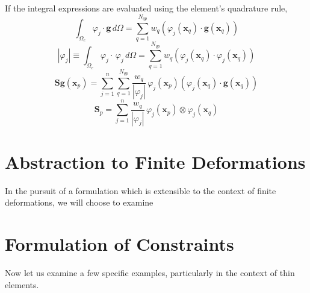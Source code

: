 \documentclass[12pt]{article}
\begin{document}
If the integral expressions are evaluated using the element's quadrature rule,
\begin{equation}
	\int_{\Omega_e} \varphi_j \cdot \mathbf{g} \, d \Omega = \sum_{q = 1}^{N_{qp}} w_q (\varphi_j (\mathbf{x}_q) \cdot \mathbf{g} (\mathbf{x}_q))
\end{equation}
\begin{equation}
	| \varphi_j | \equiv \int_{\Omega_e} \varphi_j \cdot \, \varphi_j \, d \Omega = \sum_{q = 1}^{N_{qp}} w_q (\varphi_j (\mathbf{x}_q) \cdot \varphi_j (\mathbf{x}_q))
\end{equation}
\begin{equation}
	\mathbf{S} \mathbf{g} ( \mathbf{x}_p ) = \sum_{j = 1}^{n} \sum_{q = 1}^{N_{qp}} \frac{w_q}{| \varphi_j |} \, \varphi_j ( \mathbf{x}_p ) (\varphi_j (\mathbf{x}_q) \cdot  \mathbf{g} (\mathbf{x}_q))
\end{equation}
\begin{equation}
	\mathbf{S}_p = \sum_{j = 1}^{n} \frac{w_q}{| \varphi_j |} \, \varphi_j ( \mathbf{x}_p ) \otimes \varphi_j (\mathbf{x}_q)
\end{equation}

\newpage

\section{Abstraction to Finite Deformations}

In the pursuit of a formulation which is extensible to the context of finite deformations, we will choose to examine 

\newpage

\section{Formulation of Constraints}

Now let us examine a few specific examples, particularly in the context of thin elements.
\end{document}
